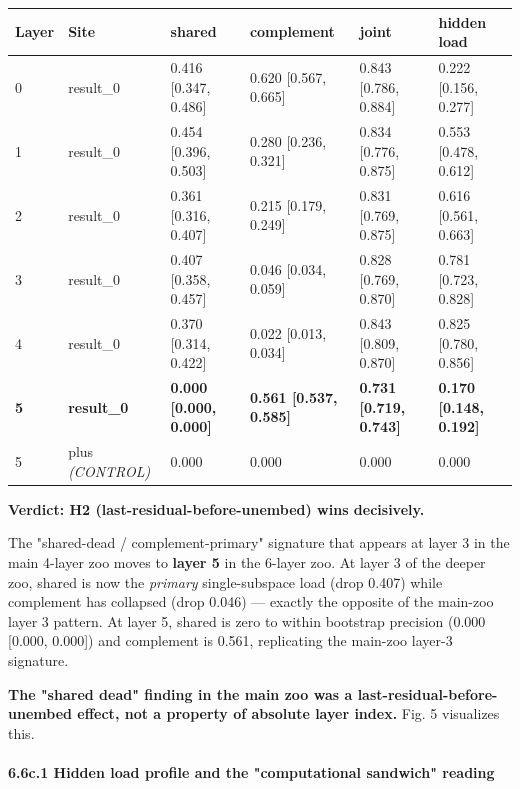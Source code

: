 \begin{center}
\begin{tabular}{|l|l|l|l|l|l|}
\hline
\textbf{Layer} & \textbf{Site} & \textbf{shared} & \textbf{complement} & \textbf{joint} & \textbf{hidden load} \\
\hline
0 & result\_0 & 0.416 [0.347, 0.486] & 0.620 [0.567, 0.665] & 0.843 [0.786, 0.884] & 0.222 [0.156, 0.277] \\
1 & result\_0 & 0.454 [0.396, 0.503] & 0.280 [0.236, 0.321] & 0.834 [0.776, 0.875] & 0.553 [0.478, 0.612] \\
2 & result\_0 & 0.361 [0.316, 0.407] & 0.215 [0.179, 0.249] & 0.831 [0.769, 0.875] & 0.616 [0.561, 0.663] \\
3 & result\_0 & 0.407 [0.358, 0.457] & 0.046 [0.034, 0.059] & 0.828 [0.769, 0.870] & 0.781 [0.723, 0.828] \\
4 & result\_0 & 0.370 [0.314, 0.422] & 0.022 [0.013, 0.034] & 0.843 [0.809, 0.870] & 0.825 [0.780, 0.856] \\
\textbf{5} & \textbf{result\_0} & \textbf{0.000 [0.000, 0.000]} & \textbf{0.561 [0.537, 0.585]} & \textbf{0.731 [0.719, 0.743]} & \textbf{0.170 [0.148, 0.192]} \\
5 & plus \emph{(CONTROL)} & 0.000 & 0.000 & 0.000 & 0.000 \\
\hline
\end{tabular}
\end{center}


\textbf{Verdict: H2 (last-residual-before-unembed) wins decisively.}

The "shared-dead / complement-primary" signature that appears at layer 3
in the main 4-layer zoo moves to \textbf{layer 5} in the 6-layer zoo. At
layer 3 of the deeper zoo, shared is now the \emph{primary} single-subspace
load (drop 0.407) while complement has collapsed (drop 0.046) ---
exactly the opposite of the main-zoo layer 3 pattern. At layer 5, shared
is zero to within bootstrap precision (0.000 [0.000, 0.000]) and
complement is 0.561, replicating the main-zoo layer-3 signature.

\textbf{The "shared dead" finding in the main zoo was a last-residual-before-unembed effect, not a property of absolute layer index.} Fig. 5 visualizes this.

\paragraph{6.6c.1 Hidden load profile and the "computational sandwich" reading}

